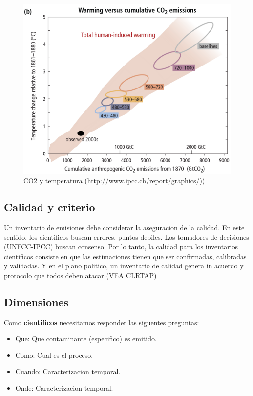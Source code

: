 \documentclass[]{book}
\providecommand{\tightlist}{%
  \setlength{\itemsep}{0pt}\setlength{\parskip}{0pt}}
\begin{document}
\begin{figure}
\includegraphics[width=1.5\linewidth]{figs/ipcc4} \caption{CO2 y temperatura (http://www.ipcc.ch/report/graphics/))}\label{fig:unnamed-chunk-25}
\end{figure}

\hypertarget{calidad-y-criterio}{%
\subsection{Calidad y criterio}\label{calidad-y-criterio}}

Un inventario de emisiones debe considerar la aseguracion de la calidad. En este sentido, los cientificos buscan errores, puntos debiles. Los tomadores de decisiones (UNFCC-IPCC) buscan consenso.
Por lo tanto, la calidad para los inventarios cientificos consiste en que las estimaciones tienen que ser confirmadas, calibradas y validadas. Y en el plano politico, un inventario de calidad genera in acuerdo y protocolo que todos deben atacar (VEA CLRTAP)

\hypertarget{dimensiones}{%
\subsection{Dimensiones}\label{dimensiones}}

Como \textbf{cientificos} necesitamos responder las siguentes preguntas:

\begin{itemize}
\tightlist
\item
  Que: Que contaminante (especifico) es emitido.
\item
  Como: Cual es el proceso.
\item
  Cuando: Caracterizacion temporal.
\item
  Onde: Caracterizacion temporal.
\end{itemize}
\end{document}
